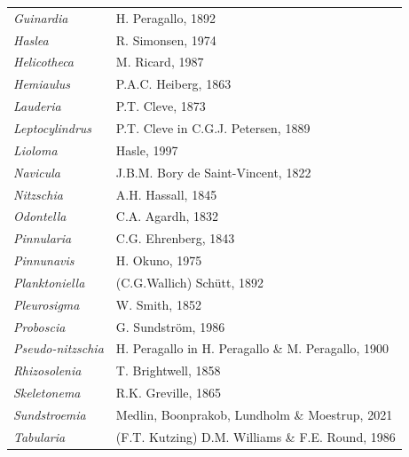 \documentclass[draft]{agujournal2019}
\begin{document}
\begin{table}
\begin{tabular}{@{}ll@{}}
\textit{Guinardia}         & H. Peragallo, 1892                                         \\
\textit{Haslea}            & R. Simonsen, 1974                                          \\
\textit{Helicotheca}       & M. Ricard, 1987                                            \\
\textit{Hemiaulus}         & P.A.C. Heiberg, 1863                                       \\
\textit{Lauderia}          & P.T. Cleve, 1873                                           \\
\textit{Leptocylindrus}    & P.T. Cleve in C.G.J. Petersen, 1889                        \\
\textit{Lioloma}           & Hasle, 1997                                                \\
\textit{Navicula}          & J.B.M. Bory de Saint-Vincent, 1822                         \\
\textit{Nitzschia}         & A.H. Hassall, 1845                                         \\
\textit{Odontella}         & C.A. Agardh, 1832                                          \\
\textit{Pinnularia}        & C.G. Ehrenberg, 1843                                       \\
\textit{Pinnunavis}        & H. Okuno, 1975                                             \\
\textit{Planktoniella}     & (C.G.Wallich) Schütt, 1892                                 \\
\textit{Pleurosigma}       & W. Smith, 1852                                             \\
\textit{Proboscia}         & G. Sundström, 1986                                         \\
\textit{Pseudo-nitzschia}  & H. Peragallo in H. Peragallo \& M. Peragallo, 1900         \\
\textit{Rhizosolenia}      & T. Brightwell, 1858                                        \\
\textit{Skeletonema}       & R.K. Greville, 1865                                        \\
\textit{Sundstroemia}      & Medlin, Boonprakob, Lundholm \& Moestrup, 2021             \\
\textit{Tabularia}         & (F.T. Kutzing) D.M. Williams \& F.E. Round, 1986           \\

\end{tabular}
\end{table}
\end{document}
